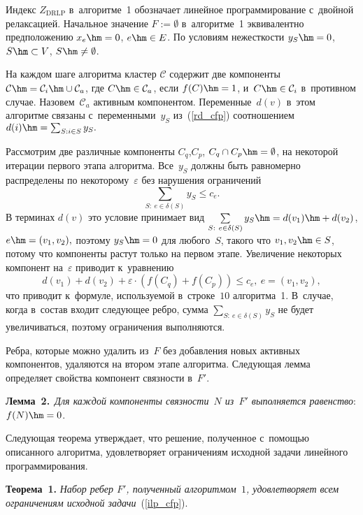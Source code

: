 \begin{multicols}{2}
Индекс $Z_{\mathrm{DRLP}}$ в~алгоритме~1 обозначает линейное 
программирование с~двойной релаксацией. Начальное значение $F:=\emptyset$ 
в~алгоритме~1 эквивалентно предположению $x_e \hm= 0$, $ e \hm\in E$. 
По условиям нежесткости $y_S \hm= 0$, $S \hm\subset V$,  $S \hm\not= \emptyset$.

На каждом шаге алгоритма кластер $\mathcal{C}$ содержит две компоненты 
$\mathcal{C} \hm= \mathcal{C}_i \hm\cup \mathcal{C}_a$, где $C\hm\in\mathcal{C }_a$, если 
$f(C) \hm= 1$, и~$C\hm\in\mathcal{C}_i$ в~противном случае. Назовем~$\mathcal{C}_a$ 
активным компонентом.
Переменные~$d(v)$ в~этом алгоритме связаны с~переменными~$y_S$ из~(\ref{rd_cfp}) 
соотношением~$d(i) \hm= \sum\nolimits_{S:i\in S}y_S.$ 

Рассмотрим две различные компоненты $C_q$,$C_p$, $C_q\cap C_p\hm=\emptyset$, на 
некоторой итерации первого этапа алгоритма. Все~$y_S$ должны быть равномерно 
распределены по некоторому~$\varepsilon$ без нарушения ограничений
$$
\sum\limits_ {S:~e\in \delta(S)}y_S\leqslant c_e. 
$$
В терминах $d(v)$ это условие принимает вид $\sum\limits_{S:~e\in \delta(S)}y_S 
\hm= d(v_1)\hm+d(v_2)$, $e\hm=( v_1,v_2),$
поэтому $y_S\hm=0$ для любого~$S$, такого что $v_1, v_2\hm\in S$, потому что 
компоненты растут только на первом этапе. Увеличение некоторых компонент на~$\varepsilon$ приводит к~уравнению
$$
d(v_1)+d(v_2)+\varepsilon\cdot \left(f(C_q)+f(C_p)\right)\leqslant 
c_e,\ e=\left(v_1,v_2\right), 
$$
что приводит к~формуле, используемой в~строке~$10$ алгоритма~1. 
В~случае, когда в~состав входит следующее ребро, сумма $\sum\nolimits_{S:~e\in 
\delta (S)}y_S$ не будет увеличиваться, поэтому ограничения выполняются.

Ребра, которые можно удалить из~$F$ без добавления новых активных компонентов, 
удаляются на втором этапе алгоритма. Следующая лемма определяет свойства 
компонент связ\-ности в~$F'$.


\smallskip

\noindent
\textbf{Лемма~2.}\
\textit{Для каждой компоненты связ\-ности~$N$ из~$F'$ выполняется равенство}: $f(N)\hm=0$.

\smallskip

Следующая теорема утверждает, что решение, полученное с~помощью описанного 
алгоритма, удовлетворяет ограничениям исходной задачи линейного 
программирования.

\smallskip

\noindent
\textbf{Теорема~1.}
\textit{Набор ребер $F'$, полученный алгоритмом~$1$, удовлетворяет всем 
ограничениям исходной задачи}~(\ref{ilp_cfp}).



\end{multicols}
